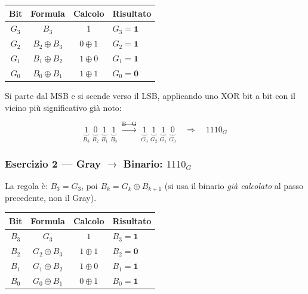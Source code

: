 \medskip
\begin{center}
\begin{tabular}{c|c|c|l}
\toprule
Bit & Formula & Calcolo & Risultato\\
\midrule
$G_3$ & $B_3$ & $1$ & $G_3 = \mathbf{1}$ \\
$G_2$ & $B_2 \oplus B_3$ & $0 \oplus 1$ & $G_2 = \mathbf{1}$ \\
$G_1$ & $B_1 \oplus B_2$ & $1 \oplus 0$ & $G_1 = \mathbf{1}$ \\
$G_0$ & $B_0 \oplus B_1$ & $1 \oplus 1$ & $G_0 = \mathbf{0}$ \\
\bottomrule
\end{tabular}
\end{center}

\medskip
\noindent Si parte dal MSB e si scende verso il LSB, applicando uno XOR bit a bit con il vicino più significativo già noto:

\[
\underbrace{1}_{B_3}\;\underbrace{0}_{B_2}\;\underbrace{1}_{B_1}\;\underbrace{1}_{B_0}
\;\xrightarrow{\text{B}\to\text{G}}\;
\underbrace{1}_{G_3}\;\underbrace{1}_{G_2}\;\underbrace{1}_{G_1}\;\underbrace{0}_{G_0}
\quad\Rightarrow\quad \boxed{1110_G}
\]

\vspace{1.5em}

\subsubsection*{Esercizio 2 — Gray $\to$ Binario: \quad $1110_G$}

La regola è: $B_3 = G_3$, poi $B_k = G_k \oplus B_{k+1}$ (si usa il binario \emph{già calcolato} al passo precedente, non il Gray).

\medskip
\begin{center}
\begin{tabular}{c|c|c|l}
\toprule
Bit & Formula & Calcolo & Risultato\\
\midrule
$B_3$ & $G_3$ & $1$ & $B_3 = \mathbf{1}$ \\
$B_2$ & $G_2 \oplus B_3$ & $1 \oplus 1$ & $B_2 = \mathbf{0}$ \\
$B_1$ & $G_1 \oplus B_2$ & $1 \oplus 0$ & $B_1 = \mathbf{1}$ \\
$B_0$ & $G_0 \oplus B_1$ & $0 \oplus 1$ & $B_0 = \mathbf{1}$ \\
\bottomrule
\end{tabular}
\end{center}

